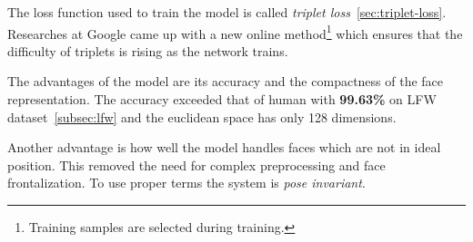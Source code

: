 The loss function used to train the model is called \textit{triplet loss}~\ref{sec:triplet-loss}.
Researches at Google came up with a new online method\footnote{Training samples are selected during training.} which
ensures that the difficulty of triplets is rising as the network trains.

The advantages of the model are its accuracy and the compactness of the face representation.
The accuracy exceeded that of human with \textbf{99.63\%} on LFW dataset~\ref{subsec:lfw} and the euclidean space has
only 128 dimensions.

Another advantage is how well the model handles faces which are not in ideal position.
This removed the need for complex preprocessing and face frontalization.
To use proper terms the system is \textit{pose invariant}.